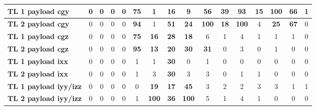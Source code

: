 \begin{table}[H]
\begin{tabular}{|l|c|c|c|c|c|c|c|c|c|c|c|c|c|c|c|}
\hline
\textcolor[rgb]{0.851, 0.373, 0.008}{\textbf{TL 1 payload \gls{cgy}}} & 0 & 0 & 0 & 0 & \textcolor[rgb]{0.000, 0.447, 0.698}{\textbf{75}} & 1 & \textbf{16} & 9 & \textcolor[rgb]{0.000, 0.447, 0.698}{\textbf{56}} & \textcolor[rgb]{0.000, 0.620, 0.451}{\textbf{39}} & \textcolor[rgb]{0.000, 0.447, 0.698}{\textbf{93}} & \textbf{15} & \textcolor[rgb]{0.835, 0.369, 0.000}{\textbf{100}} & \textcolor[rgb]{0.000, 0.447, 0.698}{\textbf{66}} & 1 \\
\hline
\textcolor[rgb]{0.851, 0.373, 0.008}{\textbf{TL 2 payload \gls{cgy}}} & 0 & 0 & 0 & 0 & \textcolor[rgb]{0.000, 0.447, 0.698}{\textbf{94}} & 1 & \textcolor[rgb]{0.000, 0.447, 0.698}{\textbf{51}} & \textbf{24} & \textcolor[rgb]{0.835, 0.369, 0.000}{\textbf{100}} & \textbf{18} & \textcolor[rgb]{0.835, 0.369, 0.000}{\textbf{100}} & 4 & \textcolor[rgb]{0.000, 0.620, 0.451}{\textbf{25}} & \textcolor[rgb]{0.000, 0.447, 0.698}{\textbf{67}} & 0 \\
\hline
\textcolor[rgb]{0.000, 0.447, 0.698}{\textbf{TL 1 payload \gls{cgz}}} & 0 & 0 & 0 & 0 & \textcolor[rgb]{0.000, 0.447, 0.698}{\textbf{75}} & \textbf{16} & \textcolor[rgb]{0.000, 0.620, 0.451}{\textbf{28}} & \textbf{18} & 6 & 1 & 4 & 1 & 1 & 1 & 0 \\
\hline
\textcolor[rgb]{0.000, 0.447, 0.698}{\textbf{TL 2 payload \gls{cgz}}} & 0 & 0 & 0 & 0 & \textcolor[rgb]{0.000, 0.447, 0.698}{\textbf{95}} & \textbf{13} & \textbf{20} & \textcolor[rgb]{0.000, 0.620, 0.451}{\textbf{30}} & \textcolor[rgb]{0.000, 0.620, 0.451}{\textbf{31}} & 0 & 3 & 0 & 1 & 0 & 0 \\
\hline
\textcolor[rgb]{0.000, 0.620, 0.451}{\textbf{TL 1 payload \gls{ixx}}} & 0 & 0 & 0 & 0 & 1 & 1 & \textcolor[rgb]{0.000, 0.620, 0.451}{\textbf{30}} & 0 & 1 & 0 & 0 & 0 & 0 & 0 & 0\\
\hline
\textcolor[rgb]{0.000, 0.620, 0.451}{\textbf{TL 2 payload \gls{ixx}}} & 0 & 0 & 0 & 0 & 1 & 3 & \textcolor[rgb]{0.000, 0.620, 0.451}{\textbf{30}} & 3 & 3 & 0 & 1 & 1 & 0 & 0 & 0\\
\hline
\textcolor[rgb]{0.000, 0.620, 0.451}{\textbf{TL 1 payload \gls{iyy}/\gls{izz}}} & 0 & 0 & 0 & 0 & 0 & \textbf{19} & \textbf{17} & \textcolor[rgb]{0.000, 0.620, 0.451}{\textbf{45}} & 3 & 2 & 2 & 3 & 3 & 1 & 1 \\
\hline
\textcolor[rgb]{0.851, 0.373, 0.008}{\textbf{TL 2 payload \gls{iyy}/\gls{izz}}} & 0 & 0 & 0 & 0 & 1 & \textcolor[rgb]{0.835, 0.369, 0.000}{\textbf{100}} & \textcolor[rgb]{0.000, 0.620, 0.451}{\textbf{36}} & \textcolor[rgb]{0.835, 0.369, 0.000}{\textbf{100}} & 5 & 1 & 4 & 1 & 0 & 0 & 0 \\
\hline

\end{tabular}%
\end{table}%

